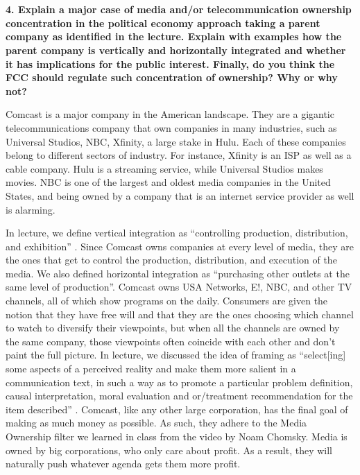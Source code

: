 \documentclass[a4paper]{article}
\begin{document}
    \section{}
        \textbf{4. Explain a major case of media and/or telecommunication ownership concentration in the political economy approach taking a parent company as identified in the lecture. Explain with examples how the parent company is vertically and horizontally integrated and whether it has implications for the public interest. Finally, do you think the FCC should regulate such concentration of ownership? Why or why not?}
        
        Comcast is a major company in the American landscape. They are a gigantic telecommunications company that own companies in many industries, such as Universal Studios, NBC, Xfinity, a large stake in Hulu.
        Each of these companies belong to different sectors of industry. For instance, Xfinity is an ISP as well as a cable company. Hulu is a streaming service, while Universal Studios makes movies.
        NBC is one of the largest and oldest media companies in the United States, and being owned by a company that is an internet service provider as well is alarming. 

        In lecture, we define vertical integration as “controlling production, distribution, and exhibition” \citep{lesson8}. Since Comcast owns companies at every level of media, they are the ones that get to control 
        the production, distribution, and execution of the media. We also defined horizontal integration as “purchasing other outlets at the same level of production”. Comcast owns USA Networks, E!, NBC, and other TV channels, 
        all of which show programs on the daily. Consumers are given the notion that they have free will and that they are the ones choosing which channel to watch to diversify their viewpoints, but when all the channels are 
        owned by the same company, those viewpoints often coincide with each other and don’t paint the full picture. In lecture, we discussed the idea of framing as “select[ing] some aspects of a perceived reality and make 
        them more salient in a communication text, in such a way as to promote a particular problem definition, causal interpretation, moral evaluation and or/treatment recommendation for the item described” \citep{lesson8}. 
        Comcast, like any other large corporation, has the final goal of making as much money as possible. As such, they adhere to the Media Ownership filter we learned in class from the video by Noam Chomsky. Media is owned by 
        big corporations, who only care about profit. As a result, they will naturally push whatever agenda gets them more profit. \citep{video}
\end{document}
